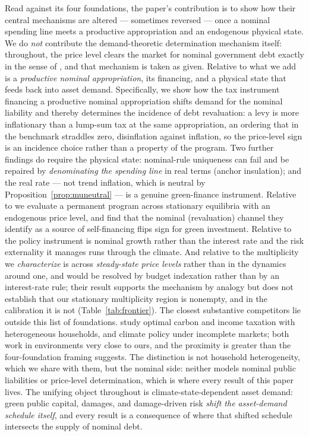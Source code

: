 \documentclass[12pt]{article}
\begin{document}
Read against its four foundations, the paper's
contribution is to show how their central mechanisms are altered ---
sometimes reversed --- once a nominal spending line meets a productive
appropriation and an endogenous physical state. We do \emph{not} contribute
the demand-theoretic determination mechanism itself: throughout, the price
level clears the market for nominal government debt exactly in the sense of
\citet{hagedorn2026dtpl}, and that mechanism is taken as given. Relative to
\citet{hagedorn2026dtpl} what we add is a \emph{productive nominal
appropriation}, its financing, and a physical state that feeds back into
asset demand. Specifically, we show how the tax instrument financing a
productive nominal appropriation shifts demand for the nominal liability and
thereby determines the incidence of debt revaluation: a levy is more
inflationary than a lump-sum tax at the same appropriation, an ordering that
in the benchmark straddles zero, disinflation against inflation, so the
price-level sign is an incidence choice rather than a property of the
program. Two further findings do require the physical state: nominal-rule
uniqueness can fail and be repaired by \emph{denominating the spending line}
in real terms (anchor insulation); and the real rate --- not trend inflation,
which is neutral by Proposition~\ref{prop:muneutral} --- is a genuine
green-finance instrument. Relative to \citet{angeletos2024deficits} we evaluate a
permanent program across stationary equilibria with an endogenous
price level, and find that the nominal (revaluation) channel they identify as
a source of self-financing flips sign for green investment. Relative to
\citet{acharya2023optimal} the policy instrument is nominal growth rather than
the interest rate and the risk externality it manages runs through the climate.
And relative to \citet{acharyabenhabib2024} the multiplicity we
\emph{characterize} is across \emph{steady-state price levels} rather than in
the dynamics around one, and would be resolved by budget indexation rather
than by an interest-rate rule; their result supports the mechanism by analogy
but does not establish that our stationary multiplicity region is nonempty,
and in the calibration it is not (Table~\ref{tab:frontier}).
The closest substantive competitors lie outside this list of foundations.
\citet{douennehummelpedroni} study optimal carbon and income taxation with
heterogeneous households, and \citet{ddhp} climate policy under incomplete
markets; both work in environments very close to ours, and the proximity is
greater than the four-foundation framing suggests. The distinction is not
household heterogeneity, which we share with them, but the nominal side:
neither models nominal public liabilities or price-level determination, which
is where every result of this paper lives.
The unifying object throughout is climate-state-dependent asset demand: green
public capital, damages, and damage-driven risk \emph{shift the asset-demand
schedule itself}, and every result is a consequence of where that shifted
schedule intersects the supply of nominal debt.
\end{document}
